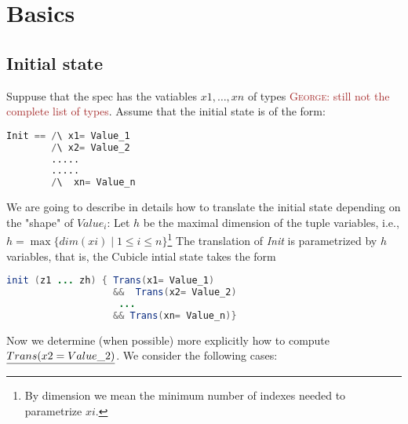 \documentclass{article}
\theoremstyle{plain}
\numberwithin{equation}{section}
\newcommand{\george}[1]{\textcolor{brown}{\textsc{George: } {\sf #1}}}
\renewcommand{\leq}{\leqslant}
\begin{document}
\large

\section{Basics}
  


\subsection*{Initial state} 
Suppuse that the spec has the vatiables $x1, \dots, xn$ of types \george{still not the complete list of types}.  
Assume that the initial state is of the form: 

\begin{lstlisting}[language=Python]
Init == /\ x1= Value_1  
        /\ x2= Value_2  
        .....
        .....
        /\  xn= Value_n   
\end{lstlisting}

We are going to describe in details how to translate the initial state depending on the "shape" of $Value_i$: Let $h$ be the maximal dimension of the tuple variables, i.e., $h=\max\{dim(xi)\mid 1\leq i \leq n\}$\footnote{By dimension we mean the minimum number of indexes needed to parametrize $xi$.} The translation of \emph{Init}  is parametrized by $h$ variables, that is, the Cubicle intial state takes the form 
\begin{lstlisting}[language=java]
init (z1 ... zh) { Trans(x1= Value_1) 
                   &&  Trans(x2= Value_2) 
                    ... 
                   && Trans(xn= Value_n)}
\end{lstlisting}
  Now we determine (when possible) more explicitly  how to compute  $\emph{Trans(x2= Value\_2)}$. We consider the following cases: 
\end{document}
